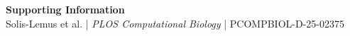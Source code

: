 \documentclass[10pt,letterpaper]{article}
\begin{document}
\begin{center}
    {\Large\textbf{Supporting Information}}\\[6pt]
    {\normalsize Solis-Lemus et al. | \textit{PLOS Computational Biology} |
    PCOMPBIOL-D-25-02375}
\end{center}

\bigskip
\linenumbers


\newpage















\nolinenumbers


\end{document}
